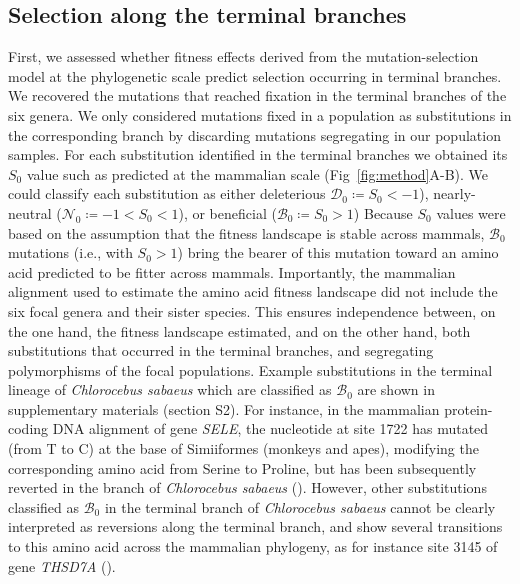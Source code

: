 \documentclass[10pt,letterpaper]{article}
\newcommand{\Sphy}{S_{0}}
\newcommand{\SphyDel}{\mathcal{D}_0}
\newcommand{\SphyNeu}{\mathcal{N}_0}
\newcommand{\SphyBen}{\mathcal{B}_0}
\begin{document}
\subsection*{Selection along the terminal branches}
First, we assessed whether fitness effects derived from the mutation-selection model at the phylogenetic scale predict selection occurring in terminal branches.
We recovered the mutations that reached fixation in the terminal branches of the six genera.
We only considered mutations fixed in a population as substitutions in the corresponding branch by discarding mutations segregating in our population samples.
For each substitution identified in the terminal branches we obtained its $\Sphy$ value such as predicted at the mammalian scale (Fig~\ref{fig:method}A-B).
We could classify each substitution as either deleterious $\SphyDel \coloneqq \Sphy < -1$), nearly-neutral ($\SphyNeu \coloneqq -1 < \Sphy <1$), or beneficial ($\SphyBen \coloneqq \Sphy > 1$)
Because $\Sphy$ values were based on the assumption that the fitness landscape is stable across mammals, $\SphyBen$ mutations (i.e., with $\Sphy>1$) bring the bearer of this mutation toward an amino acid predicted to be fitter across mammals.
Importantly, the mammalian alignment used to estimate the amino acid fitness landscape did not include the six focal genera and their sister species.
This ensures independence between, on the one hand, the fitness landscape estimated, and on the other hand, both substitutions that occurred in the terminal branches, and segregating polymorphisms of the focal populations.
Example substitutions in the terminal lineage of \textit{Chlorocebus sabaeus} which are classified as $\SphyBen$ are shown in supplementary materials (section S2).
For instance, in the mammalian protein-coding DNA alignment of gene \textit{SELE}, the nucleotide at site 1722 has mutated (from T to C) at the base of Simiiformes (monkeys and apes), modifying the corresponding amino acid from Serine to Proline, but has been subsequently reverted in the branch of \textit{Chlorocebus sabaeus} ().
However, other substitutions classified as $\SphyBen$ in the terminal branch of \textit{Chlorocebus sabaeus} cannot be clearly interpreted as reversions along the terminal branch, and show several transitions to this amino acid across the mammalian phylogeny, as for instance site 3145 of gene \textit{THSD7A} ().
\end{document}
